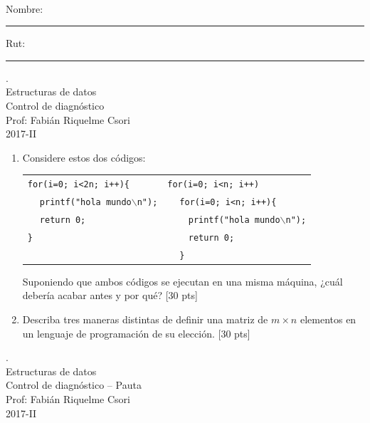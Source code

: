 \documentclass[letter,12pt,oneside]{book}
\theoremstyle{definition}
\begin{document}

\begin{center}
$~$
\end{center}

\noindent
Nombre: \rule{.6\textwidth}{.5pt} Rut: \rule{.24\textwidth}{.5pt}

\begin{center}
 {\Large
  {\color{white}.}\\
  Estructuras de datos\\[1ex]
  Control de diagnóstico}\\[1.2ex]
  Prof: Fabián Riquelme Csori\\
  2017-II
\end{center}

\begin{enumerate}
    \item Considere estos dos códigos:
    
    \begin{tabular}{p{40ex}p{40ex}}
        \texttt{for(i=0; i<2n; i++)\{}  
                    & \texttt{for(i=0; i<n; i++)} \\
        $~~~~$ \texttt{printf("hola mundo$\backslash$n");} 
                    & $~~~~$ \texttt{for(i=0; i<n; i++)\{} \\
        $~~~~$ \texttt{return 0;} 
                    & $~~~~~~~~$ \texttt{printf("hola mundo$\backslash$n");} \\
        \texttt{\}} & $~~~~~~~~$ \texttt{return 0;} \\
                    & $~~~~$ \texttt{\}}\\
    \end{tabular}
    
    Suponiendo que ambos códigos se ejecutan en una misma máquina, ¿cuál debería acabar antes y por qué? \tabto{80ex}[30 pts]
    \vspace{3cm}
    
    \item Describa tres maneras distintas de definir una matriz de $m\times n$ elementos en un lenguaje de programación de su elección. \tabto{80ex}[30 pts]
    \vspace{4cm}
    
\end{enumerate}

\newpage

\begin{center}
 {\Large
  {\color{white}.}\\[5ex]
  Estructuras de datos\\[1ex]
  Control de diagnóstico -- Pauta}\\[1.2ex]
  Prof: Fabián Riquelme Csori\\
  2017-II
\end{center}
\end{document}
